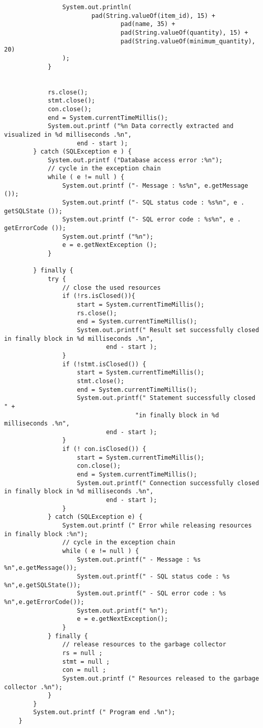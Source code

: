 \begin{lstlisting}
                System.out.println(
                        pad(String.valueOf(item_id), 15) +
                                pad(name, 35) +
                                pad(String.valueOf(quantity), 15) +
                                pad(String.valueOf(minimum_quantity), 20)
                );
            }


            rs.close();
            stmt.close();
            con.close();
            end = System.currentTimeMillis();
            System.out.printf ("%n Data correctly extracted and visualized in %d milliseconds .%n",
                    end - start );
        } catch (SQLException e ) {
            System.out.printf ("Database access error :%n");
            // cycle in the exception chain
            while ( e != null ) {
                System.out.printf ("- Message : %s%n", e.getMessage ());
                System.out.printf ("- SQL status code : %s%n", e . getSQLState ());
                System.out.printf ("- SQL error code : %s%n", e . getErrorCode ());
                System.out.printf ("%n");
                e = e.getNextException ();
            }

        } finally {
            try {
                // close the used resources
                if (!rs.isClosed()){
                    start = System.currentTimeMillis();
                    rs.close();
                    end = System.currentTimeMillis();
                    System.out.printf(" Result set successfully closed in finally block in %d milliseconds .%n",
                            end - start );
                }
                if (!stmt.isClosed()) {
                    start = System.currentTimeMillis();
                    stmt.close();
                    end = System.currentTimeMillis();
                    System.out.printf(" Statement successfully closed " +
                                    "in finally block in %d milliseconds .%n",
                            end - start );
                }
                if (! con.isClosed()) {
                    start = System.currentTimeMillis();
                    con.close();
                    end = System.currentTimeMillis();
                    System.out.printf(" Connection successfully closed in finally block in %d milliseconds .%n",
                            end - start );
                }
            } catch (SQLException e) {
                System.out.printf (" Error while releasing resources in finally block :%n");
                // cycle in the exception chain
                while ( e != null ) {
                    System.out.printf(" - Message : %s %n",e.getMessage());
                    System.out.printf(" - SQL status code : %s %n",e.getSQLState());
                    System.out.printf(" - SQL error code : %s %n",e.getErrorCode());
                    System.out.printf(" %n");
                    e = e.getNextException();
                }
            } finally {
                // release resources to the garbage collector
                rs = null ;
                stmt = null ;
                con = null ;
                System.out.printf (" Resources released to the garbage collector .%n");
            }
        }
        System.out.printf (" Program end .%n");
    }


\end{lstlisting}
